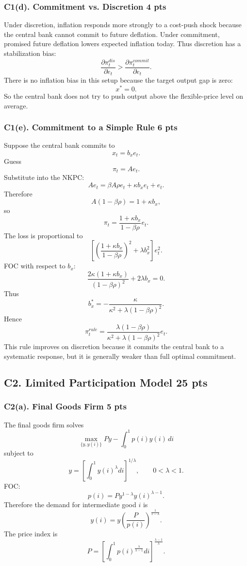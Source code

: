 \documentclass[11pt]{article}
\begin{document}
\subsubsection*{C1(d). Commitment vs. Discretion \hfill 4 pts}

Under discretion, inflation responds more strongly to a cost-push shock because the central bank cannot commit to future deflation. Under commitment, promised future deflation lowers expected inflation today. Thus discretion has a stabilization bias:
\[
\frac{\partial \pi_t^{dis}}{\partial e_t}
>
\frac{\partial \pi_t^{commit}}{\partial e_t}.
\]
There is no inflation bias in this setup because the target output gap is zero:
\[
x^*=0.
\]
So the central bank does not try to push output above the flexible-price level on average.

\subsubsection*{C1(e). Commitment to a Simple Rule \hfill 6 pts}

Suppose the central bank commits to
\[
x_t=b_xe_t.
\]
Guess
\[
\pi_t=Ae_t.
\]
Substitute into the NKPC:
\[
Ae_t=\beta A\rho e_t+\kappa b_xe_t+e_t.
\]
Therefore
\[
A(1-\beta\rho)=1+\kappa b_x,
\]
so
\[
\pi_t
=
\frac{1+\kappa b_x}{1-\beta\rho}e_t.
\]
The loss is proportional to
\[
\left[
\left(\frac{1+\kappa b_x}{1-\beta\rho}\right)^2
+\lambda b_x^2
\right]e_t^2.
\]
FOC with respect to \(b_x\):
\[
\frac{2\kappa(1+\kappa b_x)}{(1-\beta\rho)^2}
+2\lambda b_x=0.
\]
Thus
\[
b_x^*
=
-\frac{\kappa}{
\kappa^2+\lambda(1-\beta\rho)^2
}.
\]
Hence
\[
\pi_t^{rule}
=
\frac{\lambda(1-\beta\rho)}
{\kappa^2+\lambda(1-\beta\rho)^2}e_t.
\]
This rule improves on discretion because it commits the central bank to a systematic response, but it is generally weaker than full optimal commitment.

\subsection*{C2. Limited Participation Model \hfill 25 pts}

\subsubsection*{C2(a). Final Goods Firm \hfill 5 pts}

The final goods firm solves
\[
\max_{\{y,y(i)\}}
Py-\int_0^1p(i)y(i)\,di
\]
subject to
\[
y=
\left[
\int_0^1y(i)^\lambda di
\right]^{1/\lambda},
\qquad 0<\lambda<1.
\]
FOC:
\[
p(i)=P y^{1-\lambda}y(i)^{\lambda-1}.
\]
Therefore the demand for intermediate good \(i\) is
\[
y(i)
=
y\left(\frac{P}{p(i)}\right)^{\frac{1}{1-\lambda}}.
\]
The price index is
\[
P
=
\left[
\int_0^1p(i)^{\frac{\lambda}{\lambda-1}}di
\right]^{\frac{\lambda-1}{\lambda}}.
\]
\end{document}
